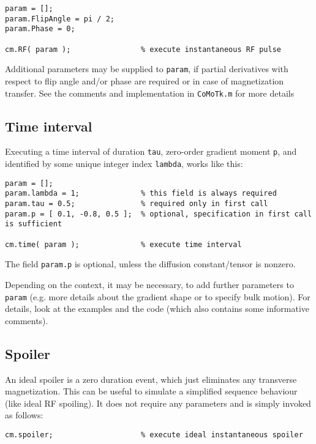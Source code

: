 \documentclass[a4paper,10pt]{article}
\begin{document}
\begin{verbatim}
param = [];
param.FlipAngle = pi / 2;
param.Phase = 0;

cm.RF( param );                % execute instantaneous RF pulse
\end{verbatim}

Additional parameters may be supplied to \texttt{param}, if partial derivatives with respect to flip angle and/or phase are required
or in case of magnetization transfer. See the comments and implementation in \texttt{CoMoTk.m} for more details 

\subsection{Time interval}
\label{sec:orgeabb177}
Executing a time interval of duration \texttt{tau}, zero-order gradient moment \texttt{p}, and identified by some unique integer index
\texttt{lambda}, works like this:

\begin{verbatim}
param = [];
param.lambda = 1;              % this field is always required
param.tau = 0.5;               % required only in first call
param.p = [ 0.1, -0.8, 0.5 ];  % optional, specification in first call is sufficient

cm.time( param );              % execute time interval
\end{verbatim}

The field \texttt{param.p} is optional, unless the diffusion constant/tensor is nonzero.

Depending on the context, it may be necessary, to add further parameters to \texttt{param} 
(e.g. more details about the gradient shape or to specify bulk motion).
For details, look at the examples and the code (which also contains some informative comments).

\subsection{Spoiler}
\label{sec:orga5ea769}
An ideal spoiler is a zero duration event, which just eliminates any transverse magnetization. This can be useful to simulate
a simplified sequence behaviour (like ideal RF spoiling).
It does not require any parameters and is simply invoked as follows:

\begin{verbatim}
cm.spoiler;                    % execute ideal instantaneous spoiler
\end{verbatim}
\end{document}

